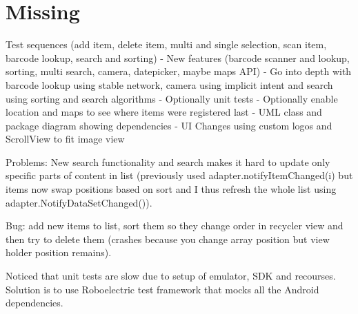 \documentclass{article}
\begin{document}
\section{Missing}
Test sequences (add item, delete item, multi and single selection, scan item, barcode lookup, search and sorting)
- New features (barcode scanner and lookup, sorting, multi search, camera, datepicker, maybe maps API)
- Go into depth with barcode lookup using stable network, camera using implicit intent and search using sorting and search algorithms 
- Optionally unit tests 
- Optionally enable location and maps to see where items were registered last 
- UML class and package diagram showing dependencies 
- UI Changes using custom logos and ScrollView to fit image view 

Problems:
New search functionality and search makes it hard to update only specific parts of content in list (previously used adapter.notifyItemChanged(i) but items now swap positions based on sort and I thus refresh the whole list using adapter.NotifyDataSetChanged()).

Bug: add new items to list, sort them so they change order in recycler view and then try to delete them (crashes because you change array position but view holder position remains). 

Noticed that unit tests are slow due to setup of emulator, SDK and recourses. Solution is to use Roboelectric test framework that mocks all the Android dependencies. 

	
\end{document}
